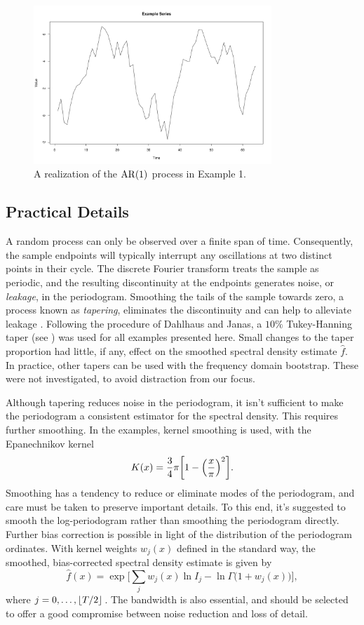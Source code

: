     \begin{figure}[hb]
    \centering
    \includegraphics[width = 0.8\textwidth]{../res/ex1.png}
    \caption{
        A realization of the $\operatorname{AR}(1)$ process in Example 1.
        }
    \label{ex1}
    \end{figure}
\subsection*{Practical Details}
A random process can only be observed over a finite span of time.
Consequently, the sample endpoints will typically interrupt any oscillations
at two distinct points in their cycle.
The discrete Fourier transform treats the sample as periodic,
and the resulting discontinuity at the endpoints generates noise,
or \textit{leakage}, in the periodogram.
Smoothing the tails of the sample towards zero,
a process known as \textit{tapering},
eliminates the discontinuity and can help to alleviate leakage \cite{shumway}.
Following the procedure of Dahlhaus and Janas,
a $10\%$ Tukey-Hanning taper (see \cite{dahlhaus}) 
was used for all examples presented here.
Small changes to the taper proportion had little, if any,
effect on the smoothed spectral density estimate $\hat{f}$.
In practice, other tapers can be used with the frequency domain bootstrap.
These were not investigated, to avoid distraction from our focus.

Although tapering reduces noise in the periodogram,
it isn't sufficient to make the periodogram a consistent estimator for the
spectral density.
This requires further smoothing.
In the examples, kernel smoothing is used, with the Epanechnikov kernel
    \[
    K(x) 
    = 
    \frac{3}{4}\pi \biggl[ 1 - \Bigl( \frac{x}{\pi} \Bigr)^2 \biggr].
    \]
Smoothing has a tendency to reduce or eliminate modes of the periodogram,
and care must be taken to preserve important details.
To this end, it's suggested to smooth the log-periodogram rather than smoothing
the periodogram directly.
Further bias correction is possible in light of the distribution of the
periodogram ordinates.
With kernel weights $w_j(x)$ defined in the standard way,
the smoothed, bias-corrected spectral density estimate is given by
    \[
    \hat{f}(x)
    =
    \exp\biggl[
        \sum_{j} w_j(x) \ln I_{j} 
        - \ln \Gamma\bigl(1 + w_j(x)\bigr)
    \biggr],
    \]
where $j = 0, \ldots, \lfloor T / 2\rfloor$.
The bandwidth is also essential, 
and should be selected to offer a good compromise between noise reduction and
loss of detail.

